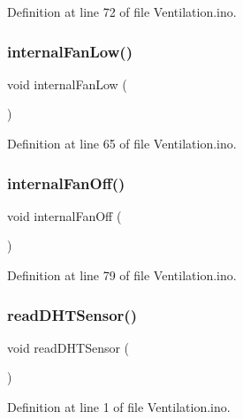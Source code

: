 Definition at line 72 of file Ventilation.\+ino.

\mbox{\label{_ventilation_8ino_aee0bd9e99a4eea02dc662a7c525fdd00}} 
\subsubsection{\texorpdfstring{internalFanLow()}{internalFanLow()}}
{\footnotesize\ttfamily void internal\+Fan\+Low (\begin{DoxyParamCaption}{ }\end{DoxyParamCaption})}



Definition at line 65 of file Ventilation.\+ino.

\mbox{\label{_ventilation_8ino_ac3655433167829c8cf8dda2d8506541a}} 
\subsubsection{\texorpdfstring{internalFanOff()}{internalFanOff()}}
{\footnotesize\ttfamily void internal\+Fan\+Off (\begin{DoxyParamCaption}{ }\end{DoxyParamCaption})}



Definition at line 79 of file Ventilation.\+ino.

\mbox{\label{_ventilation_8ino_addab9f8e1614db39413943ea97718749}} 
\subsubsection{\texorpdfstring{readDHTSensor()}{readDHTSensor()}}
{\footnotesize\ttfamily void read\+D\+H\+T\+Sensor (\begin{DoxyParamCaption}{ }\end{DoxyParamCaption})}



Definition at line 1 of file Ventilation.\+ino.

